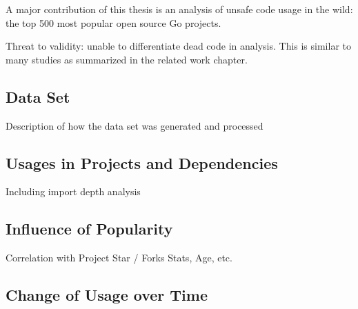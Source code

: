 A major contribution of this thesis is an analysis of unsafe code usage in the wild:
the top 500 most popular open source Go projects.

Threat to validity: unable to differentiate dead code in analysis.
This is similar to many studies as summarized in the related work chapter.



\subsection{Data Set}\label{subsec:go-geiger:evaluation:data-set}

Description of how the data set was generated and processed



\subsection{Usages in Projects and Dependencies}\label{subsec:go-geiger:evaluation:unsafe-usage}

Including import depth analysis







\subsection{Influence of Popularity}\label{subsec:go-geiger:evaluation:popularity}

Correlation with Project Star / Forks Stats, Age, etc.




\subsection{Change of Usage over Time}\label{subsec:go-geiger:evaluation:over-time}

